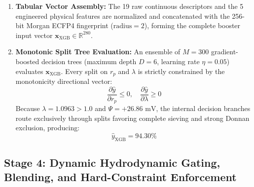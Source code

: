 \documentclass[11pt]{article}
\begin{document}
\begin{enumerate}[leftmargin=1.0cm]
    \item \textbf{Tabular Vector Assembly:} The 19 raw continuous descriptors and the 5 engineered physical features are normalized and concatenated with the 256-bit Morgan ECFP4 fingerprint ($\text{radius} = 2$), forming the complete booster input vector $\mathbf{x}_{\mathrm{XGB}} \in \mathbb{R}^{280}$.
    \item \textbf{Monotonic Split Tree Evaluation:} An ensemble of $M = 300$ gradient-boosted decision trees (maximum depth $D = 6$, learning rate $\eta = 0.05$) evaluates $\mathbf{x}_{\mathrm{XGB}}$. Every split on $r_p$ and $\lambda$ is strictly constrained by the monotonicity directional vector:
    \begin{equation}
    \frac{\partial \hat{y}}{\partial r_p} \le 0, \quad \frac{\partial \hat{y}}{\partial \lambda} \ge 0
    \end{equation}
    Because $\lambda = 1.0963 > 1.0$ and $\Psi = +26.86\text{ mV}$, the internal decision branches route exclusively through splits favoring complete sieving and strong Donnan exclusion, producing:
    \begin{equation}
    \hat{y}_{\mathrm{XGB}} = 94.30\%
    \end{equation}
\end{enumerate}

\subsection{Stage 4: Dynamic Hydrodynamic Gating, Blending, and Hard-Constraint Enforcement}
\label{sec:walkthrough_gating}
\end{document}
